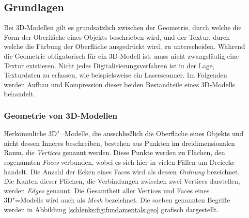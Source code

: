 \subsection{Grundlagen}

Bei 3D-Modellen gilt es grundsätzlich zwischen der Geometrie, durch welche die Form der Oberfläche eines Objekts beschrieben wird, und der Textur, durch welche die Färbung der Oberfläche ausgedrückt wird, zu unterscheiden. Während die Geometrie obligatorisch für ein 3D-Modell ist, muss nicht zwangsläufig eine Textur existieren. Nicht jedes Digitalisierungsverfahren ist in der Lage, Texturdaten zu erfassen, wie beispielsweise ein Laserscanner. Im Folgenden werden Aufbau und Kompression dieser beiden Bestandteile eines 3D-Modells behandelt.

\subsubsection{Geometrie von 3D-Modellen}

Herkömmliche 3D"=Modelle, die ausschließlich die Oberfläche eines Objekts und nicht dessen Inneres beschreiben, bestehen aus Punkten im dreidimensionalen Raum, die \emph{Vertices} genannt werden. Diese Punkte werden zu Flächen, den sogenannten \emph{Faces} verbunden, wobei es sich hier in vielen Fällen um Dreiecke handelt. Die Anzahl der Ecken eines Faces wird als dessen \emph{Ordnung} bezeichnet. Die Kanten dieser Flächen, die Verbindungen zwischen zwei Vertices darstellen, werden \emph{Edges} genannt. Die Gesamtheit aller Vertices und Faces eines 3D"=Modells wird auch als \emph{Mesh} bezeichnet. Die soeben genannten Begriffe werden in Abbildung \ref{schlenke:fig:fundamentals:geo} grafisch dargestellt.


